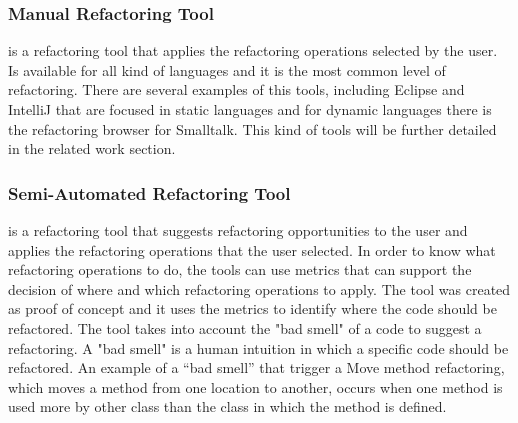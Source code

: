 \subsubsection{Manual Refactoring Tool}
is a refactoring tool that applies the refactoring operations selected by the user.
Is available for all kind of languages and it is the most common level of refactoring.
There are several examples of this tools, including Eclipse and IntelliJ that are focused in static languages and for dynamic languages there is the refactoring browser for Smalltalk.
This kind of tools will be further detailed in the related work section.






\subsubsection{Semi-Automated Refactoring Tool}
is a refactoring tool that suggests refactoring opportunities to the user and applies the refactoring operations that the user selected. 
In order to know what refactoring operations to do, the tools can use metrics that can support the decision of where and which refactoring operations to apply. 
The tool \cite{simon2001metrics} was created as proof of concept and it uses the metrics to identify where the code should be refactored.
The tool takes into account the "bad smell" of a code to suggest a refactoring. 
A "bad smell" is a human intuition in which a specific code should be refactored. 
An example of a ``bad smell'' that trigger a Move method refactoring, which moves a method from one location to another, occurs when one method is used more by other class than the class in which the method is defined.

